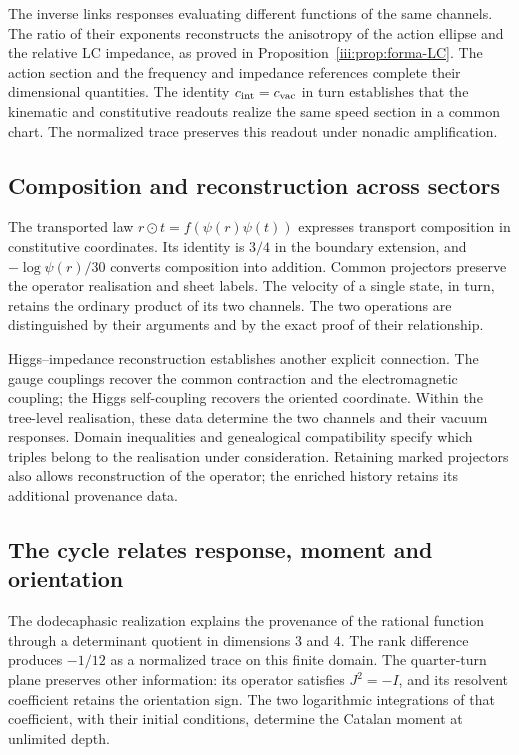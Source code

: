 The inverse links responses evaluating different functions of the
same channels. The ratio of their exponents reconstructs the
anisotropy of the action ellipse and the relative LC impedance,
as proved in Proposition~\ref{iii:prop:forma-LC}. The action
section and the frequency and impedance references complete their dimensional quantities.
The identity $c_{\rm int}=c_{\rm vac}$ in turn establishes that
the kinematic and constitutive readouts realize the same speed
section in a common chart. The normalized trace preserves this
readout under nonadic amplification.

\subsection*{Composition and reconstruction across sectors}

The transported law $r\odot t=f(\psi(r)\psi(t))$ expresses transport
composition in constitutive coordinates. Its identity is $3/4$ in the
boundary extension, and $-\log\psi(r)/30$ converts composition into
addition. Common projectors preserve the operator realisation and sheet
labels. The velocity of a single state, in turn, retains the ordinary
product of its two channels. The two operations are distinguished by
their arguments and by the exact proof of their relationship.

Higgs--impedance reconstruction establishes another explicit connection.
The gauge couplings recover the common contraction and the
electromagnetic coupling; the Higgs self-coupling recovers the oriented
coordinate. Within the tree-level realisation, these data determine
the two channels and their vacuum responses. Domain inequalities and
genealogical compatibility specify which triples belong to the
realisation under consideration. Retaining marked projectors also
allows reconstruction of the operator; the enriched history retains
its additional provenance data.

\subsection*{The cycle relates response, moment and orientation}

The dodecaphasic realization explains the provenance of the rational
function through a determinant quotient in dimensions $3$ and $4$.
The rank difference produces $-1/12$ as a normalized trace on this
finite domain. The quarter-turn plane preserves other information:
its operator satisfies $J^2=-I$, and its resolvent coefficient
retains the orientation sign. The two logarithmic integrations of
that coefficient, with their initial conditions, determine the
Catalan moment at unlimited depth.

